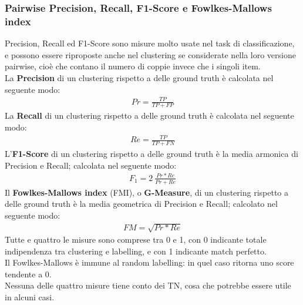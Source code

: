 \subsubsection{Pairwise Precision, Recall, F1-Score e Fowlkes-Mallows index}
Precision, Recall ed F1-Score sono misure molto usate nel task di classificazione, e possono essere riproposte anche nel clustering se considerate nella loro versione pairwise, cioè che contano il numero di coppie invece che i singoli item.\\
La \textbf{Precision} di un clustering rispetto a delle ground truth è calcolata nel seguente modo:
\begin{align}
Pr = \frac{TP}{TP + FP}
\end{align}
La \textbf{Recall} di un clustering rispetto a delle ground truth è calcolata nel seguente modo:
\begin{align}
Re = \frac{TP}{TP + FN}
\end{align}
L'\textbf{F1-Score} di un clustering rispetto a delle ground truth è la media armonica di Precision e Recall; calcolata nel seguente modo:
\begin{align}
F_1 = 2\:\frac{Pr * Re}{Pr + Re}
\end{align}
Il \textbf{Fowlkes-Mallows index} (FMI), o \textbf{G-Measure}, di un clustering rispetto a delle ground truth è la media geometrica di Precision e Recall; calcolato nel seguente modo:
\begin{align}
FM = \sqrt{Pr * Re}
\end{align}
Tutte e quattro le misure sono comprese tra 0 e 1, con 0 indicante totale indipendenza tra clustering e labelling, e con 1 indicante match perfetto.\\
Il Fowlkes-Mallows è immune al random labelling: in quel caso ritorna uno score tendente a 0.\\
Nessuna delle quattro misure tiene conto dei TN, cosa che potrebbe essere utile in alcuni casi.

